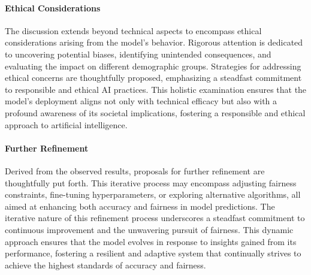 \paragraph{Ethical Considerations}

The discussion extends beyond technical aspects to encompass ethical considerations arising from the model's behavior. Rigorous attention is dedicated to uncovering potential biases, identifying unintended consequences, and evaluating the impact on different demographic groups. Strategies for addressing ethical concerns are thoughtfully proposed, emphasizing a steadfast commitment to responsible and ethical AI practices. This holistic examination ensures that the model's deployment aligns not only with technical efficacy but also with a profound awareness of its societal implications, fostering a responsible and ethical approach to artificial intelligence.

\paragraph{Further Refinement}

Derived from the observed results, proposals for further refinement are thoughtfully put forth. This iterative process may encompass adjusting fairness constraints, fine-tuning hyperparameters, or exploring alternative algorithms, all aimed at enhancing both accuracy and fairness in model predictions. The iterative nature of this refinement process underscores a steadfast commitment to continuous improvement and the unwavering pursuit of fairness. This dynamic approach ensures that the model evolves in response to insights gained from its performance, fostering a resilient and adaptive system that continually strives to achieve the highest standards of accuracy and fairness.

